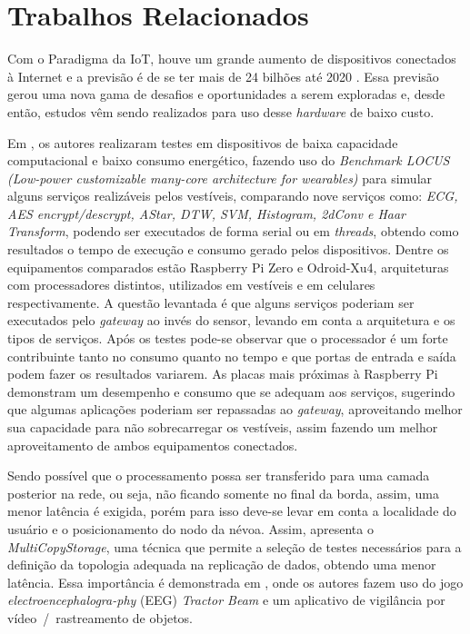 \documentclass[12pt,english,brazil]{article}
\begin{document}
\section{Trabalhos Relacionados} \label{sec:TrabalhosRelacionados}

Com o Paradigma da IoT, houve um grande aumento de dispositivos conectados à Internet e a previsão é de se ter mais de 24 bilhões até 2020 \cite{gubbi2013internet}. Essa previsão gerou uma nova gama de desafios e oportunidades a serem exploradas e, desde então, estudos vêm sendo realizados para uso desse \textit{hardware} de baixo custo.

Em \cite{inproceedings}, os autores realizaram testes em dispositivos de baixa capacidade computacional e baixo consumo energético, fazendo uso do
\textit{Benchmark LOCUS (Low-power customizable many-core architecture for wearables)} para simular alguns serviços realizáveis pelos vestíveis, comparando nove serviços como: \textit{ECG, AES encrypt/descrypt, AStar, DTW, SVM, Histogram, 2dConv e Haar Transform}, podendo ser executados de forma serial ou em \textit{threads}, obtendo como resultados o tempo de execução e consumo gerado pelos dispositivos. Dentre os equipamentos comparados estão Raspberry Pi Zero e Odroid-Xu4, arquiteturas com processadores distintos, utilizados em vestíveis e em celulares respectivamente. A questão levantada é que alguns serviços poderiam ser executados pelo \textit{gateway} ao invés do sensor, levando em conta a arquitetura e os tipos de serviços. Após os testes pode-se observar que o processador é um forte contribuinte tanto no consumo quanto no tempo e que portas de entrada e saída podem fazer os resultados variarem. As placas mais próximas à Raspberry Pi demonstram um desempenho e consumo que se adequam aos serviços, sugerindo que algumas aplicações poderiam ser repassadas ao \textit{gateway}, aproveitando melhor sua capacidade para não sobrecarregar os vestíveis, assim fazendo um melhor aproveitamento de ambos equipamentos conectados.  


Sendo possível que o processamento possa ser transferido para uma camada posterior na rede, ou seja, não ficando somente no final da borda, assim,  uma menor latência é exigida, porém para isso deve-se levar em conta a localidade do usuário e o posicionamento do nodo da névoa. Assim, \cite{Huang2019} apresenta o \textit{MultiCopyStorage}, uma técnica que permite a seleção de testes necessários para a definição da topologia adequada na replicação de dados, obtendo uma menor latência. Essa importância é demonstrada em \cite{luiz}, onde os autores fazem uso do jogo \textit{electroencephalogra-phy} (EEG) \textit{Tractor Beam} e um aplicativo de vigilância por vídeo~/~rastreamento de objetos. 
\end{document}

